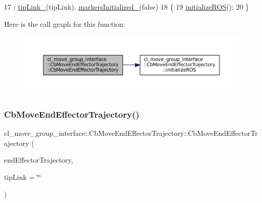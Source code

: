 \begin{DoxyCode}
17         : \hyperlink{classcl__move__group__interface_1_1CbMoveEndEffectorTrajectory_a24c6c30b9b0761a61fa002d947bd3e11}{tipLink\_}(tipLink), \hyperlink{classcl__move__group__interface_1_1CbMoveEndEffectorTrajectory_ac140a7f0adfb20f1e2900a5c8cd2ca5b}{markersInitialized\_}(\textcolor{keyword}{false})
18     \{
19         \hyperlink{classcl__move__group__interface_1_1CbMoveEndEffectorTrajectory_afcee8f3853a5cef8806137a304c8a14b}{initializeROS}();
20     \}
\end{DoxyCode}
Here is the call graph for this function\+:
\nopagebreak
\begin{figure}[H]
\begin{center}
\leavevmode
\includegraphics[width=350pt]{classcl__move__group__interface_1_1CbMoveEndEffectorTrajectory_af7e718b0c53e912fd74968abbb0a4810_cgraph}
\end{center}
\end{figure}
\mbox{\label{classcl__move__group__interface_1_1CbMoveEndEffectorTrajectory_ae6985de3f8f0e1ec7dea88c1e551889a}} 
\subsubsection{\texorpdfstring{Cb\+Move\+End\+Effector\+Trajectory()}{CbMoveEndEffectorTrajectory()}\hspace{0.1cm}{\footnotesize\ttfamily [2/2]}}
{\footnotesize\ttfamily cl\+\_\+move\+\_\+group\+\_\+interface\+::\+Cb\+Move\+End\+Effector\+Trajectory\+::\+Cb\+Move\+End\+Effector\+Trajectory (\begin{DoxyParamCaption}\item[{const std\+::vector$<$ geometry\+\_\+msgs\+::\+Pose\+Stamped $>$ \&}]{end\+Effector\+Trajectory,  }\item[{std\+::string}]{tip\+Link = {\ttfamily \char`\"{}\char`\"{}} }\end{DoxyParamCaption})}



